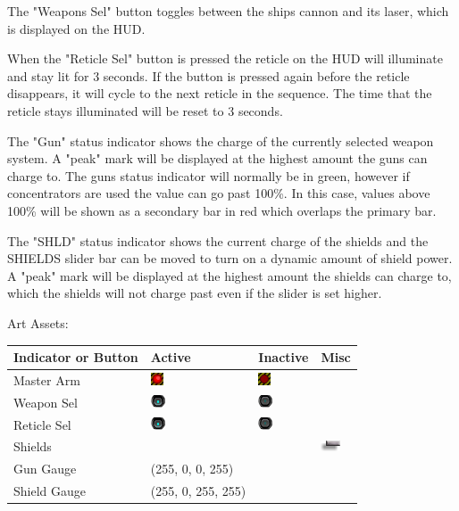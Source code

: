 The "Weapons Sel" button toggles between the ships cannon and its laser, 
which is displayed on the HUD.

When the "Reticle Sel" button is pressed the reticle on the HUD will
illuminate and stay lit for 3 seconds.  If the button is pressed again
before the reticle disappears, it will cycle to the next reticle
in the sequence.  The time that the reticle stays illuminated will
be reset to 3 seconds.

The "Gun" status indicator shows the charge of the currently selected
weapon system.  A "peak" mark will be displayed at the highest amount
the guns can charge to.  The guns status indicator will normally be in
green, however if concentrators are used the value can go past 100\%.
In this case, values above 100\% will be shown as a secondary bar in
red which overlaps the primary bar.

The "SHLD" status indicator shows the current charge of the shields and
the SHIELDS slider bar can be moved to turn on a dynamic amount of
shield power.  A "peak" mark will be displayed at the highest amount
the shields can charge to, which the shields will not charge past
even if the slider is set higher.

Art Assets:

\begin{tabular}{ | l | l | l | l | }
\hline
Indicator or Button & Active & Inactive & Misc\\
\hline
Master Arm & \includegraphics{images/button_danger_on.png} & \includegraphics{images/button_danger_off.png} & \\
Weapon Sel & \includegraphics{images/button_on.png} & \includegraphics{images/button_off.png} & \\
Reticle Sel & \includegraphics{images/button_on.png} & \includegraphics{images/button_off.png} & \\
Shields & & & \includegraphics{images/slider.png} \\
Gun Gauge & (255, 0, 0, 255) & & \\
Shield Gauge & (255, 0, 255, 255) & & \\
\hline
\end{tabular}

